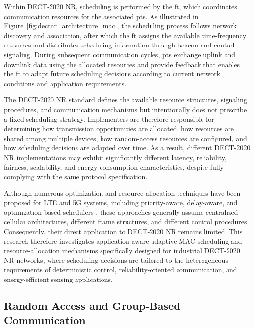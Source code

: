 \documentclass[12pt,a4paper]{article}
\begin{document}
Within DECT-2020 NR, scheduling is performed by the \gls{ft}, which coordinates communication resources for the associated \glspl{pt}. As illustrated in Figure~\ref{fig:dectnr_architecture_mac}, the scheduling process follows network discovery and association, after which the \gls{ft} assigns the available time-frequency resources and distributes scheduling information through beacon and control signaling. During subsequent communication cycles, \glspl{pt} exchange uplink and downlink data using the allocated resources and provide feedback that enables the \gls{ft} to adapt future scheduling decisions according to current network conditions and application requirements.

The DECT-2020 NR standard defines the available resource structures, signaling procedures, and communication mechanisms but intentionally does not prescribe a fixed scheduling strategy. Implementers are therefore responsible for determining how transmission opportunities are allocated, how resources are shared among multiple devices, how random-access resources are configured, and how scheduling decisions are adapted over time. As a result, different DECT-2020 NR implementations may exhibit significantly different latency, reliability, fairness, scalability, and energy-consumption characteristics, despite fully complying with the same protocol specification.

Although numerous optimization and resource-allocation techniques have been proposed for LTE and 5G systems, including priority-aware, delay-aware, and optimization-based schedulers \cite{andrewsProvidingQualityService2001,liuEfficientResourceAllocation2024,bahetiPriorityawareRadioResource2026nr1}, these approaches generally assume centralized cellular architectures, different frame structures, and different control procedures. Consequently, their direct application to DECT-2020 NR remains limited. This research therefore investigates application-aware adaptive MAC scheduling and resource-allocation mechanisms specifically designed for industrial DECT-2020 NR networks, where scheduling decisions are tailored to the heterogeneous requirements of deterministic control, reliability-oriented communication, and energy-efficient sensing applications.

\subsection{Random Access and Group-Based Communication}
\label{subsec:random_access}
\end{document}
